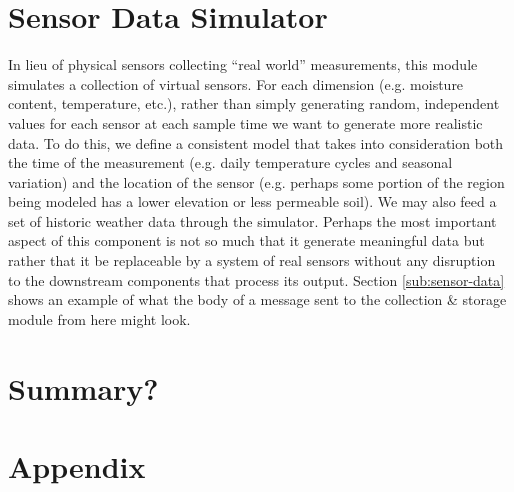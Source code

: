 \documentclass{article}
\begin{document}
\section{Sensor Data Simulator}
In lieu of physical sensors collecting ``real world'' measurements,
this module simulates a collection of virtual sensors.
For each dimension (e.g. moisture content, temperature, etc.), rather than simply
generating random, independent values for each sensor at each sample time
we want to generate more realistic data.
To do this, we define a consistent model that takes into consideration both
the time of the measurement (e.g. daily temperature cycles and seasonal variation) and
the location of the sensor (e.g. perhaps some portion of the region being modeled has a lower elevation or less permeable soil).
We may also feed a set of historic weather data through the simulator.
Perhaps the most important aspect of this component is not so much that it generate meaningful data
but rather that it be replaceable by a system of real sensors without any disruption to the downstream
components that process its output.
Section \ref{sub:sensor-data} shows an example of what the body of a message
sent to the collection \& storage module from here might look.


\section{Summary?}

\section{Appendix}
\end{document}
